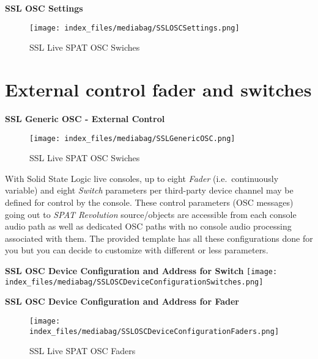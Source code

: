 \documentclass[
  letterpaper,
  DIV=11,
  numbers=noendperiod]{scrreport}
\begin{document}
\textbf{SSL OSC Settings}

\begin{figure}

{\centering \texttt{[image: index\_files/mediabag/SSLOSCSettings.png]}

}

\caption{SSL Live SPAT OSC Swiches}

\end{figure}

\hypertarget{external-control-fader-and-switches}{%
\section{External control fader and
switches}\label{external-control-fader-and-switches}}

\textbf{SSL Generic OSC - External Control}

\begin{figure}

{\centering \texttt{[image: index\_files/mediabag/SSLGenericOSC.png]}

}

\caption{SSL Live SPAT OSC Swiches}

\end{figure}

With Solid State Logic live consoles, up to eight \emph{Fader}
(i.e.~continuously variable) and eight \emph{Switch} parameters per
third-party device channel may be defined for control by the console.
These control parameters (OSC messages) going out to \emph{SPAT
Revolution} source/objects are accessible from each console audio path
as well as dedicated OSC paths with no console audio processing
associated with them. The provided template has all these configurations
done for you but you can decide to customize with different or less
parameters.

\textbf{SSL OSC Device Configuration and Address for Switch}
\texttt{[image: index\_files/mediabag/SSLOSCDeviceConfigurationSwitches.png]}

\textbf{SSL OSC Device Configuration and Address for Fader}

\begin{figure}

{\centering \texttt{[image: index\_files/mediabag/SSLOSCDeviceConfigurationFaders.png]}

}

\caption{SSL Live SPAT OSC Faders}

\end{figure}
\end{document}
